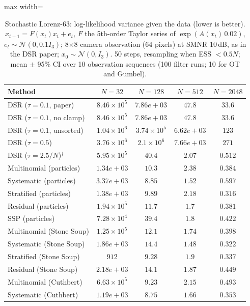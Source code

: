 \begin{table}[H]
\centering
\small
\caption{Stochastic Lorenz-63: log-likelihood variance given the data (lower is better). $x_{t+1}=F(x_t)x_t+e_t$, $F$ the 5th-order Taylor series of $\exp(A(x_t)\,0.02)$, $e_t\sim\mathcal N(0,0.1I_3)$; 8$\times$8 camera observation (64 pixels) at SMNR 10\,dB, as in the DSR paper; $x_0\sim\mathcal N(0,I_3)$. 50 steps, resampling when ESS $<0.5N$; mean $\pm$ 95\% CI over 10 observation sequences (100 filter runs; 10 for OT and Gumbel).}
\label{tab:lorenz63-conditional_loglik_variance}
\begin{adjustbox}{max width=\linewidth}
\begin{tabular}{lcccc}
\toprule
Method & $N{=}32$ & $N{=}128$ & $N{=}512$ & $N{=}2048$ \\
\midrule
DSR ($\tau{=}0.1$, paper) & $8.46\times10^{5}$ & $7.86e+03$ & $47.8$ & $33.6$ \\
DSR ($\tau{=}0.1$, no clamp) & $8.46\times10^{5}$ & $7.86e+03$ & $47.8$ & $33.6$ \\
DSR ($\tau{=}0.1$, unsorted) & $1.04\times10^{6}$ & $3.74\times10^{5}$ & $6.62e+03$ & $123$ \\
DSR ($\tau{=}0.5$) & $3.76\times10^{6}$ & $2.1\times10^{6}$ & $7.66e+03$ & $271$ \\
DSR ($\tau{=}2.5/N$)$^\dagger$ & $5.95\times10^{5}$ & $40.4$ & $2.07$ & $0.512$ \\
\midrule
Multinomial (particles) & $1.34e+03$ & $10.3$ & $2.38$ & $0.384$ \\
Systematic (particles) & $3.37e+03$ & $8.85$ & $1.52$ & $0.597$ \\
Stratified (particles) & $1.38e+03$ & $9.89$ & $2.18$ & $0.316$ \\
Residual (particles) & $1.94\times10^{5}$ & $11.7$ & $1.7$ & $0.381$ \\
SSP (particles) & $7.28\times10^{4}$ & $39.4$ & $1.8$ & $0.422$ \\
Multinomial (Stone Soup) & $1.25\times10^{5}$ & $12.1$ & $1.74$ & $0.398$ \\
Systematic (Stone Soup) & $1.86e+03$ & $14.4$ & $1.48$ & $0.322$ \\
Stratified (Stone Soup) & $912$ & $9.28$ & $1.9$ & $0.337$ \\
Residual (Stone Soup) & $2.18e+03$ & $14.1$ & $1.87$ & $0.449$ \\
Multinomial (Cuthbert) & $6.63\times10^{5}$ & $9.23$ & $2.15$ & $0.493$ \\
Systematic (Cuthbert) & $1.19e+03$ & $8.75$ & $1.66$ & $0.353$ \\

\end{tabular}
\end{adjustbox}
\end{table}
